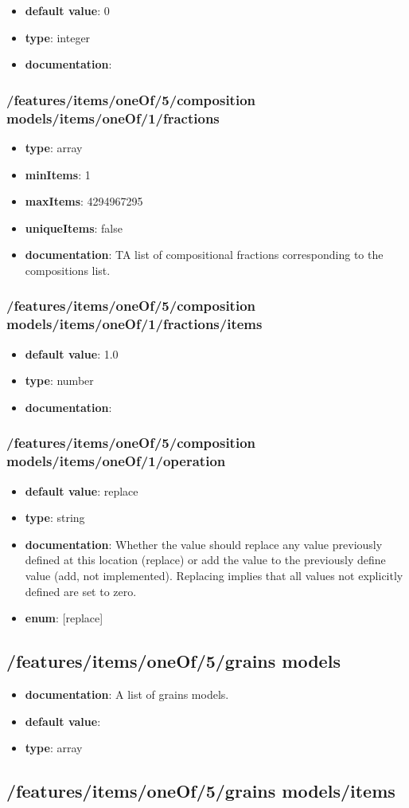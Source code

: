 \begin{itemize}\item {\bf default value}: 0
\item {\bf type}: integer
\item {\bf documentation}: 
\end{itemize}\subsubsection{/features/items/oneOf/5/composition models/items/oneOf/1/fractions}
\begin{itemize}\item {\bf type}: array
\item {\bf minItems}: 1
\item {\bf maxItems}: 4294967295
\item {\bf uniqueItems}: false
\item {\bf documentation}: TA list of compositional fractions corresponding to the compositions list.
\end{itemize}\subsubsection{/features/items/oneOf/5/composition models/items/oneOf/1/fractions/items}
\begin{itemize}\item {\bf default value}: 1.0
\item {\bf type}: number
\item {\bf documentation}: 
\end{itemize}\subsubsection{/features/items/oneOf/5/composition models/items/oneOf/1/operation}
\begin{itemize}\item {\bf default value}: replace
\item {\bf type}: string
\item {\bf documentation}: Whether the value should replace any value previously defined at this location (replace) or add the value to the previously define value (add, not implemented). Replacing implies that all values not explicitly defined are set to zero.
\item {\bf enum}: [replace]\end{itemize}\subsection{/features/items/oneOf/5/grains models}
\begin{itemize}\item {\bf documentation}: A list of grains models.
\item {\bf default value}: 
\item {\bf type}: array
\end{itemize}\subsection{/features/items/oneOf/5/grains models/items}

